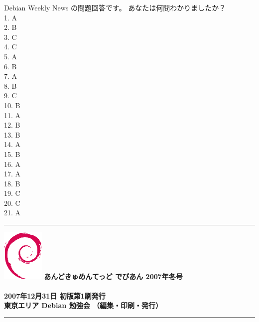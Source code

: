 \documentclass[mingoth,a4paper]{jsarticle}
\begin{document}
\begin{multicols}{2}
 Debian Weekly News の問題回答です。
 あなたは何問わかりましたか？
 \\
1. A\\
2. B\\
3. C\\
4. C\\
5. A\\
6. B\\
7. A\\
8. B\\
9. C\\
10. B\\
11. A\\
12. B\\
13. B\\
14. A\\
15. B\\
16. A\\
17. A\\
18. B\\
19. C\\
20. C\\
21. A\\

\end{multicols}


\printindex

\cleartooddpage

\vspace*{15cm}
{\color{dancerlightblue}\rule{\hsize}{1mm}}
\vspace{2mm}
\includegraphics[width=2cm]{image200502/openlogo-nd.eps}
\noindent \Large \bf あんどきゅめんてっど でびあん 2007年冬号\\ \\
\noindent \normalfont 2007年12月31日 \hspace{5mm}  初版第1刷発行\\
\noindent \normalfont 東京エリア Debian 勉強会 （編集・印刷・発行）\\
{\color{dancerdarkblue}\rule{\hsize}{1mm}}
\end{document}
